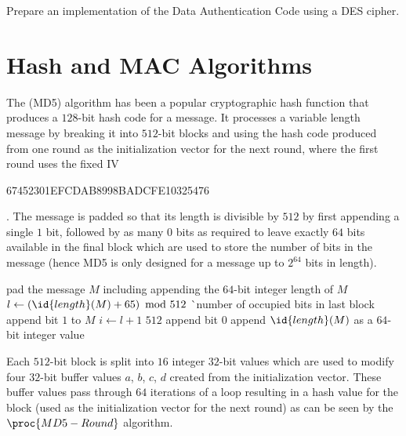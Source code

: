 \begin{exercise}
Prepare an implementation of the Data Authentication Code using a DES cipher.
\end{exercise}



\section{Hash and MAC Algorithms}
The  (MD5) algorithm has been a popular cryptographic hash function
that produces a $128$-bit hash code for a message.
It processes a variable length message by breaking it into $512$-bit blocks and using the
hash code produced from one round as the initialization vector for the next round,
where the first round uses the fixed IV
\begin{code}67452301EFCDAB8998BADCFE10325476\end{code}.
The message is padded so that its length is divisible by $512$ by first appending a
single $1$ bit, followed by as many $0$ bits as required to leave exactly $64$ bits
available in the final block which are used to store the number of bits in the message
(hence MD5 is only designed for a message up to $2^{64}$ bits in length).
\begin{codebox}
\li \Comment pad the message $M$ including appending the $64$-bit integer length of $M$
\li $l \gets \left(\id{length}(M)+65\right)\mbox{ mod }512$
   \`\Comment number of occupied bits in last block
\li append bit $1$ to $M$
\li \For $i\gets l+1$ \To $512$ \Do
\li    append bit $0$
    \End
\li append $\id{length}(M)$ as a $64$-bit integer value
\end{codebox}
Each $512$-bit block is split into $16$ integer $32$-bit values which are used to modify
four $32$-bit buffer values $a$, $b$, $c$, $d$ created from the initialization vector.
These buffer values pass through $64$ iterations of a loop resulting in a hash value for
the block (used as the initialization vector for the next round) as can be seen by the
$\proc{MD5-Round}$ algorithm.
